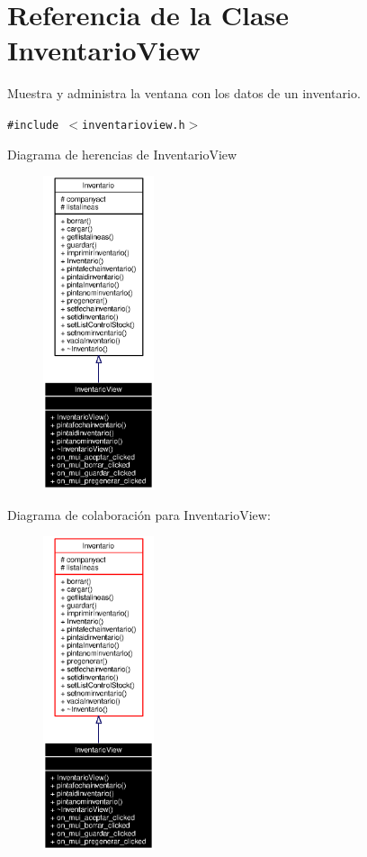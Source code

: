 \section{Referencia de la Clase Inventario\-View}
\label{classInventarioView}
Muestra y administra la ventana con los datos de un inventario.  


{\tt \#include $<$inventarioview.h$>$}

Diagrama de herencias de Inventario\-View\begin{figure}[H]
\begin{center}
\leavevmode
\includegraphics[width=92pt]{classInventarioView__inherit__graph}
\end{center}
\end{figure}
Diagrama de colaboraci\'{o}n para Inventario\-View:\begin{figure}[H]
\begin{center}
\leavevmode
\includegraphics[width=92pt]{classInventarioView__coll__graph}
\end{center}
\end{figure}
